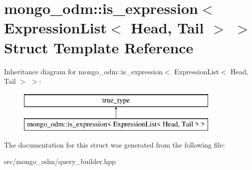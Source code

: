 \hypertarget{structmongo__odm_1_1is__expression_3_01ExpressionList_3_01Head_00_01Tail_01_4_01_4}{}\section{mongo\+\_\+odm\+:\+:is\+\_\+expression$<$ Expression\+List$<$ Head, Tail $>$ $>$ Struct Template Reference}
\label{structmongo__odm_1_1is__expression_3_01ExpressionList_3_01Head_00_01Tail_01_4_01_4}
Inheritance diagram for mongo\+\_\+odm\+:\+:is\+\_\+expression$<$ Expression\+List$<$ Head, Tail $>$ $>$\+:\begin{figure}[H]
\begin{center}
\leavevmode
\includegraphics[height=2.000000cm]{structmongo__odm_1_1is__expression_3_01ExpressionList_3_01Head_00_01Tail_01_4_01_4}
\end{center}
\end{figure}


The documentation for this struct was generated from the following file\+:\begin{DoxyCompactItemize}
\item 
src/mongo\+\_\+odm/query\+\_\+builder.\+hpp\end{DoxyCompactItemize}
